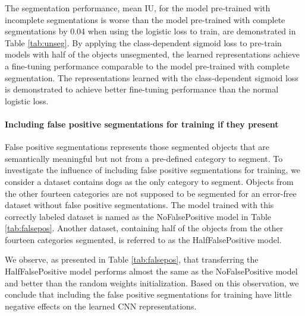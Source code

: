 The segmentation performance, mean IU, for the model pre-trained with incomplete segmentations is worse than the model pre-trained with complete segmentations by 0.04 when using the logistic loss to train, are demonstrated in Table \ref{tab:unseg}.
By applying the class-dependent sigmoid loss to pre-train models with half of the objects unsegmented, the learned representations achieve a fine-tuning performance comparable to the model pre-trained with complete segmentation.
The representations learned with the class-dependent sigmoid loss is demonstrated to achieve better fine-tuning performance than the normal logistic loss.



\paragraph{Including false positive segmentations for training if they present}
False positive segmentations represents those segmented objects that are semantically meaningful but not from a pre-defined category to segment.
To investigate the influence of including false positive segmentations for training, we consider a dataset contains dogs as the only category to segment.
Objects from the other fourteen categories are not supposed to be segmented for an error-free dataset without false positive segmentations.
The model trained with this correctly labeled dataset is named as the NoFalsePositive model in Table \ref{tab:falsepos}.
Another dataset, containing half of the objects from the other fourteen categories segmented, is referred to as the HalfFalsePositive model.

We observe, as presented in Table \ref{tab:falsepos}, that transferring the HalfFalsePositive model performs almost the same as the NoFalsePositive model and better than the random weights initialization.
Based on this observation, we conclude that including the false positive segmentations for training have little negative effects on the learned CNN representations.


